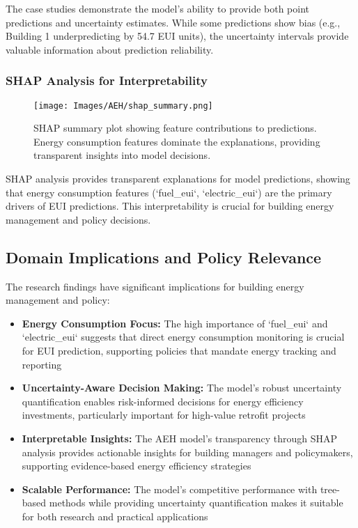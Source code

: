 The case studies demonstrate the model's ability to provide both point predictions and uncertainty estimates. While some predictions show bias (e.g., Building 1 underpredicting by 54.7 EUI units), the uncertainty intervals provide valuable information about prediction reliability.

\subsubsection{SHAP Analysis for Interpretability}

\begin{figure}[ht]
    \centering
    \texttt{[image: Images/AEH/shap\_summary.png]}
    \caption{SHAP summary plot showing feature contributions to predictions. Energy consumption features dominate the explanations, providing transparent insights into model decisions.}
    \label{fig:shap_summary}
\end{figure}

SHAP analysis provides transparent explanations for model predictions, showing that energy consumption features (`fuel\_eui`, `electric\_eui`) are the primary drivers of EUI predictions. This interpretability is crucial for building energy management and policy decisions.

\subsection{Domain Implications and Policy Relevance}

The research findings have significant implications for building energy management and policy:

\begin{itemize}
    \item \textbf{Energy Consumption Focus:} The high importance of `fuel\_eui` and `electric\_eui` suggests that direct energy consumption monitoring is crucial for EUI prediction, supporting policies that mandate energy tracking and reporting
    
    \item \textbf{Uncertainty-Aware Decision Making:} The model's robust uncertainty quantification enables risk-informed decisions for energy efficiency investments, particularly important for high-value retrofit projects
    
    \item \textbf{Interpretable Insights:} The AEH model's transparency through SHAP analysis provides actionable insights for building managers and policymakers, supporting evidence-based energy efficiency strategies
    
    \item \textbf{Scalable Performance:} The model's competitive performance with tree-based methods while providing uncertainty quantification makes it suitable for both research and practical applications
\end{itemize}

